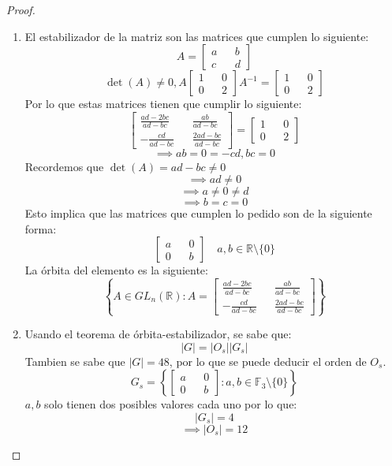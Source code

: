 \documentclass[11pt]{article}
\newcommand{\set}[1]{\mathbb{#1}}
\theoremstyle{definition}
\begin{document}
\begin{proof}
    \
    \begin{enumerate}[label=(\alph*)]
        \item El estabilizador de la matriz son las matrices que cumplen lo siguiente:
        \[A=\begin{bmatrix}
            a && b \\
            c && d
        \end{bmatrix}\]
        \[\det(A)\neq 0, A\begin{bmatrix}
            1 && 0 \\
            0 && 2
        \end{bmatrix}A^{-1}=\begin{bmatrix}
            1 && 0 \\
            0 && 2
        \end{bmatrix}\]
        Por lo que estas matrices tienen que cumplir lo siguiente:
        \[\begin{bmatrix}
            \frac{ad-2bc}{ad-bc} && \frac{ab}{ad-bc}\\
            -\frac{cd}{ad-bc} && \frac{2ad-bc}{ad-bc}
        \end{bmatrix}=\begin{bmatrix}
            1 && 0 \\
            0 && 2
        \end{bmatrix}\]
        \[\implies ab=0=-cd,bc=0\]
        Recordemos que $\det(A)=ad-bc\neq 0$
        \[\implies ad\neq 0\]
        \[\implies a\neq 0\neq d\]
        \[\implies b=c=0\]
        Esto implica que las matrices que cumplen lo pedido son de la siguiente forma:
        \[\begin{bmatrix}
            a && 0 \\
            0 && b
        \end{bmatrix}\quad a,b\in\set{R}\setminus\{0\}\]
        La órbita del elemento es la siguiente:
        \[\left\{A\in GL_n(\set{R}):A=\begin{bmatrix}
            \frac{ad-2bc}{ad-bc} && \frac{ab}{ad-bc}\\
            -\frac{cd}{ad-bc} && \frac{2ad-bc}{ad-bc}
        \end{bmatrix}\right\}\]

        \item Usando el teorema de órbita-estabilizador, se sabe que:
        \[|G|=|O_s||G_s|\]
        Tambien se sabe que $|G|=48$, por lo que se puede deducir el orden de $O_s$.
        \[G_s=\left\{\begin{bmatrix}
        a && 0 \\
        0 && b
        \end{bmatrix}:a,b\in\set{F}_3\setminus\{0\}\right\}\]
        $a,b$ solo tienen dos posibles valores cada uno por lo que:
        \[|G_s|=4\]
        \[\implies |O_s|=12\]
    \end{enumerate}
\end{proof}
\end{document}
